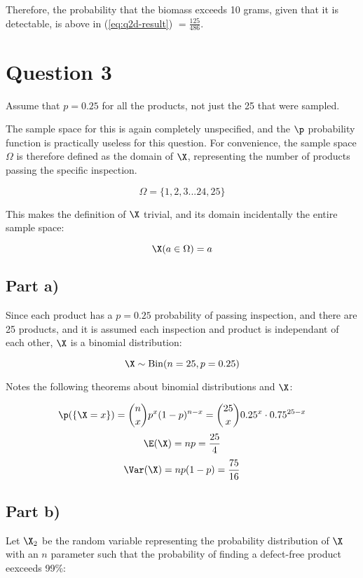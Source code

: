Therefore, the probability that the biomass exceeds 10 grams, given that it is detectable, is above in (\ref{eq:q2d-result}) $ = \frac{125}{486}$.

\vspace{0.5cm}

\section{Question 3}

Assume that $p = 0.25$ for all the products, not just the 25 that were sampled.

The sample space for this is again completely unspecified, and the $\p$ probability function is practically useless for this question.
For convenience, the sample space $\Omega$ is therefore defined as the domain of $\X$, representing the number of products passing the specific inspection.

\[
\Omega = \{ 1, 2, 3 ... 24, 25 \}
\]

This makes the definition of $\X$ trivial, and its domain incidentally the entire sample space:

\[
\X(a \in \Omega) = a
\]


\subsection{Part a)}

Since each product has a $p = 0.25$ probability of passing inspection, and there are 25 products, and it is assumed each inspection and product is independant of each other, $\X$ is a binomial distribution:

\[
\X \sim \mathrm{Bin}(n = 25, p = 0.25)
\]

Notes the following theorems about binomial distributions and $\X$:

\[
\p(\{ \X = x \}) = {n \choose x}p^x (1-p)^{n - x} = {25 \choose x}0.25^x \cdot 0.75^{25 - x}
\]
\[
\E(\X) = np = \frac{25}{4}
\]
\[
\Var(\X) = np(1-p) = \frac{75}{16}
\]

\subsection{Part b)}

Let $\X_2$ be the random variable representing the probability distribution of $\X$ with an $n$ parameter
such that the probability of finding a defect-free product eexceeds 99\%:


